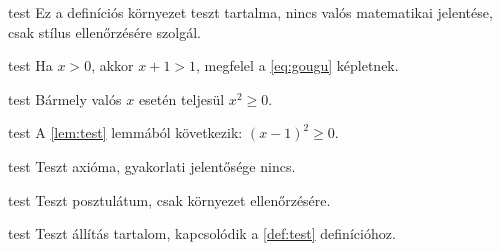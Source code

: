 \documentclass[hu]{../../elegantbook}
\begin{document}
\ifdefined\simpleTest
\begin{definition}\label{def:test}
\else
\begin{definition}{test}
\fi
Ez a definíciós környezet teszt tartalma, nincs valós matematikai jelentése, csak stílus ellenőrzésére szolgál.
\end{definition}

\ifdefined\simpleTest
\begin{theorem}\label{thm:test}
\else
\begin{theorem}{test}
\fi
Ha $x>0$, akkor $x+1>1$, megfelel a \eqref{eq:gougu} képletnek.
\end{theorem}

\ifdefined\simpleTest
\begin{lemma}\label{lem:test}
\else
\begin{lemma}{test}
\fi
Bármely valós $x$ esetén teljesül $x^2\geq0$.
\end{lemma}

\ifdefined\simpleTest
\begin{corollary}\label{cor:test}
\else
\begin{corollary}{test}
\fi
A \ref{lem:test} lemmából következik: $(x-1)^2\geq0$.
\end{corollary}

\ifdefined\simpleTest
\begin{axiom}\label{axi:test}
\else
\begin{axiom}{test}
\fi
Teszt axióma, gyakorlati jelentősége nincs.
\end{axiom}

\ifdefined\simpleTest
\begin{postulate}\label{pos:test}
\else
\begin{postulate}{test}
\fi
Teszt posztulátum, csak környezet ellenőrzésére.
\end{postulate}

\ifdefined\simpleTest
\begin{proposition}\label{pro:test}
\else
\begin{proposition}{test}
\fi
Teszt állítás tartalom, kapcsolódik a \ref{def:test} definícióhoz.
\end{proposition}


\end{proposition}
\end{postulate}
\end{axiom}
\end{corollary}
\end{lemma}
\end{theorem}
\end{definition}
\end{document}
